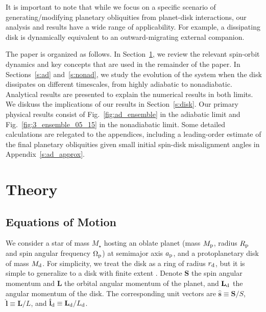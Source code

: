 \documentclass[twocolumn,twocolappendix]{aastex63}
\newcommand*{\bsmb}[1]{\boldsymbol{\mathbf{#1}}}
\newcommand*{\uv}[1]{\hat{\bsmb{#1}}}
\begin{document}
It is important to note that while we focus on a specific scenario of
generating/modifying planetary obliquities from planet-disk interactions, our
analysis and results have a wide range of applicability. For example, a
dissipating disk is dynamically equivalent to an outward-migrating external
companion.

The paper is organized as follows. In Section~\ref{s:eq}, we review the relevant
spin-orbit dynamics and key concepts that are used in the remainder of the
paper. In Sections~\ref{s:ad} and~\ref{s:nonad}, we study the evolution of the
system when the disk dissipates on different timescales, from highly adiabatic
to nonadiabatic. Analytical results are presented to explain the numerical
results in both limits. We diskuss the implications of our results in
Section~\ref{s:disk}. Our primary physical results consist of
Fig.~\ref{fig:ad_ensemble} in the adiabatic limit and
Fig.~\ref{fig:3_ensemble_05_15} in the nonadiabatic limit. Some detailed
calculations are relegated to the appendices, including a leading-order
estimate of the final planetary obliquities given small initial spin-disk
misalignment angles in Appendix~\ref{s:ad_approx}.

\section{Theory}\label{s:eq}

\subsection{Equations of Motion}

We consider a star of mass $M_\star$ hosting an oblate planet (mass $M_{\rm p}$,
radius $R_{\rm p}$ and spin angular frequency $\Omega_{\rm p}$) at semimajor
axis $a_{\rm p}$, and a protoplanetary disk of mass $M_{\rm d}$. For simplicity,
we treat the disk as a ring of radius $r_{\rm d}$, but it is simple to
generalize to a disk with finite extent \citep[see][]{millholland_disk}. Denote
$\bsmb{S}$ the spin angular momentum and $\bsmb{L}$ the orbital angular momentum of
the planet, and $\bsmb{L}_{\rm d}$ the angular momentum of the disk. The
corresponding unit vectors are $\uv{s} \equiv \bsmb{S} / S$, $\uv{l} \equiv \bsmb{L}
/ L$, and $\uv{l}_{\rm d} \equiv \bsmb{L}_{\rm d} / L_{\rm d}$.
\end{document}
